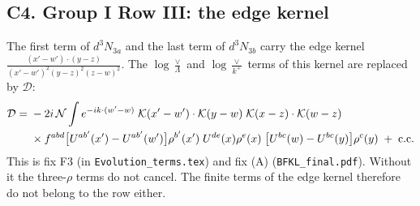 \documentclass[9pt]{article}
\newcommand{\KK}{\mathcal K}
\numberwithin{equation}{section}
\begin{document}
\subsection*{C4. Group I Row III: the edge kernel}
The first term of $d^3N_{3a}$ and the last term of $d^3N_{3b}$ carry the edge kernel $\frac{(x'-w')\cdot(y-z)}{(x'-w')^{2}(y-z)^{2}(z-w)^{2}}$. The $\log\frac{\vee}{\Lambda}$ and $\log\frac{\vee}{k^+}$ terms of this kernel are replaced by $\mathcal D$:
\begin{align*}
\mathcal D={}&-2i\,\mathcal N\int e^{-ik\cdot(w'-w)}\;\KK(x'-w')\cdot\KK(y-w)\;\KK(x-z)\cdot\KK(w-z)\notag\\
&\times f^{abd}\big[U^{ab'}(x')-U^{ab'}(w')\big]\rho^{b'}(x')\;U^{de}(x)\rho^e(x)\;\big[U^{bc}(w)-U^{bc}(y)\big]\rho^c(y)\;+\;{\rm c.c.}
\end{align*}
This is fix F3 (in \texttt{Evolution\_terms.tex}) and fix (A) (\texttt{BFKL\_final.pdf}). Without it the three-$\rho$ terms do not cancel. The finite terms of the edge kernel therefore do not belong to the row either.
\end{document}
